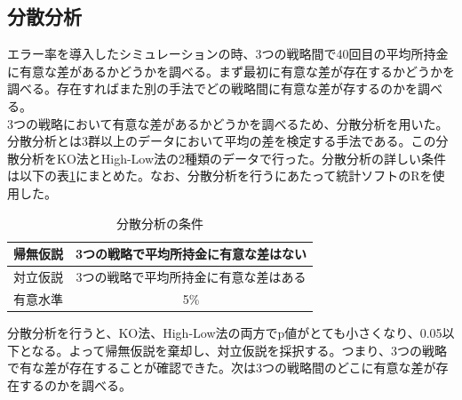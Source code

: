 \subsection{分散分析}
エラー率を導入したシミュレーションの時、3つの戦略間で40回目の平均所持金に有意な差があるかどうかを調べる。まず最初に有意な差が存在するかどうかを調べる。存在すればまた別の手法でどの戦略間に有意な差が存するのかを調べる。\\
3つの戦略において有意な差があるかどうかを調べるため、分散分析を用いた。分散分析とは3群以上のデータにおいて平均の差を検定する手法である。この分散分析をKO法とHigh-Low法の2種類のデータで行った。分散分析の詳しい条件は以下の表\ref{conditions-b}にまとめた。なお、分散分析を行うにあたって統計ソフトのRを使用した。
\begin{table}[H]
 \caption{分散分析の条件\label{conditions-b}}
 \begin{center}
  \begin{tabular}{|c|c|}
  \hline 帰無仮説 & 3つの戦略で平均所持金に有意な差はない \\
  \hline 対立仮説 & 3つの戦略で平均所持金に有意な差はある \\
  \hline 有意水準 & 5\% \\
  \hline
  \end{tabular}
 \end{center}
\end{table}
分散分析を行うと、KO法、High-Low法の両方でp値がとても小さくなり、0.05以下となる。よって帰無仮説を棄却し、対立仮説を採択する。つまり、3つの戦略で有な差が存在することが確認できた。次は3つの戦略間のどこに有意な差が存在するのかを調べる。

